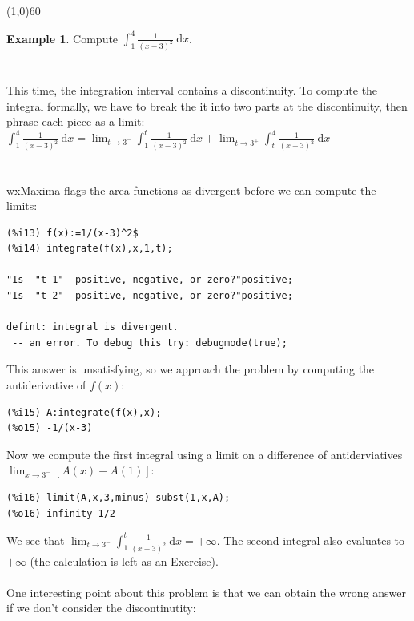 \documentclass[10.5pt,twoside]{report}
\theoremstyle{definition}
\newtheorem{exmp}{Example}[section]
\begin{document}
\line(1,0){60}
\linethickness{0.5mm}


\begin{exmp} Compute $\displaystyle \int_1^4 \frac{1}{(x-3)^2}\ \mathrm{d}x$.\\
${}$\\
${}$\\
This time, the integration interval contains a discontinuity.  To compute the integral formally, we have to break the it into two parts at the discontinuity, then phrase each piece as a limit:  $\displaystyle \int_1^4 \frac{1}{(x-3)^2}\ \mathrm{d}x = \displaystyle \lim_{t \to 3^-} \displaystyle \int_1^t \frac{1}{(x-3)^2}\ \mathrm{d}x + \displaystyle \lim_{t \to 3^+} \displaystyle \int_t^4 \frac{1}{(x-3)^2}\ \mathrm{d}x$\\

${}$\\
${}$\\
wxMaxima flags the area functions as divergent before we can compute the limits:

\begin{verbatim}
(%i13) f(x):=1/(x-3)^2$
(%i14) integrate(f(x),x,1,t);

"Is  "t-1"  positive, negative, or zero?"positive;
"Is  "t-2"  positive, negative, or zero?"positive;

defint: integral is divergent.
 -- an error. To debug this try: debugmode(true);
\end{verbatim}


This answer is unsatisfying, so we approach the problem by computing the antiderivative of $f(x)$:

\begin{verbatim}
(%i15) A:integrate(f(x),x);
(%o15) -1/(x-3)
\end{verbatim}

Now we compute the first integral using a limit on a difference of antiderviatives $\displaystyle \lim_{x \to 3^-} [A(x)-A(1)]$:

\begin{verbatim}
(%i16) limit(A,x,3,minus)-subst(1,x,A);
(%o16) infinity-1/2
\end{verbatim}

We see that $\displaystyle \lim_{t \to 3^-} \displaystyle \int_1^t \frac{1}{(x-3)^2}\ \mathrm{d}x=+\infty$.  The second integral also evaluates to $+\infty$ (the calculation is left as an Exercise).\\




${}$\\
One interesting point about this problem is that we can obtain the wrong answer if we don't consider the discontinutity:


\end{exmp}
\end{document}
